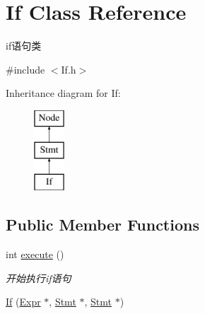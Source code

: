 \hypertarget{class_if}{}\section{If Class Reference}
\label{class_if}


if语句类  




{\ttfamily \#include $<$If.\+h$>$}

Inheritance diagram for If\+:\begin{figure}[H]
\begin{center}
\leavevmode
\includegraphics[height=3.000000cm]{class_if}
\end{center}
\end{figure}
\subsection*{Public Member Functions}
\begin{DoxyCompactItemize}
\item 
\mbox{\label{class_if_aeadf929258ccd07a239879c118fb152f}} 
int \hyperlink{class_if_aeadf929258ccd07a239879c118fb152f}{execute} ()
\begin{DoxyCompactList}\small\item\em 开始执行if语句 \end{DoxyCompactList}\item 
\hyperlink{class_if_a398387169436db838e9935b985a8f4a9}{If} (\hyperlink{class_expr}{Expr} $\ast$, \hyperlink{class_stmt}{Stmt} $\ast$, \hyperlink{class_stmt}{Stmt} $\ast$)
\end{DoxyCompactItemize}
